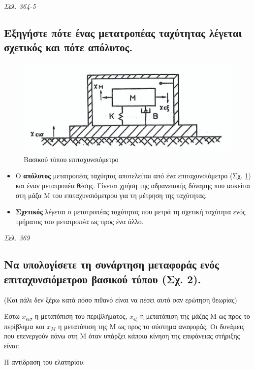 \documentclass{article}
\begin{document}
\emph{Σελ. 364-5}

\subsection{Εξηγήστε πότε ένας μετατροπέας ταχύτητας λέγεται σχετικός και πότε απόλυτος.}

\begin{figure}[h!]
    \includegraphics[width=\linewidth]{epitaxinsiometro.png}
    \caption{Βασικού τύπου επιταχυνσιόμετρο}
    \label{fig:5.1epitax}
\end{figure}

\begin{itemize}
    \item Ο \textbf{απόλυτος} μετατροπέας ταχύητας αποτελείται από ένα επιταχυνσιόμετρο (Σχ. \ref{fig:5.1epitax}) και έναν μετατροπέα θέσης.
        Γίνεται χρήση της  αδρανειακής δύναμης που ασκείται στη μάζα Μ του επιταχυνσιόμετρου για τη μέτρηση της ταχύτητας.
    \item \textbf{Σχετικός} λέγεται ο μετατροπέας ταχύτητας που μετρά τη σχετική ταχύτητα ενός τμήματος του μετατροπέα ως προς ένα άλλο.
\end{itemize}

\emph{Σελ. 369}

\subsection{Να υπολογίσετε τη συνάρτηση μεταφοράς ενός επιταχυνσιόμετρου βασικού τύπου (Σχ. 2).}
(Και πάλι δεν ξέρω κατά πόσο πιθανό είναι να πέσει αυτό σαν ερώτηση θεωρίας)

Έστω $x_{\epsilon\iota\sigma}$ η μετατόπιση του περιβλήματος, $x_{\epsilon\xi}$ η μετατόπιση της μάζας Μ ως προς το περίβλημα και $x_M$
η μετατόπιση της Μ ως προς το σύστημα αναφοράς. Οι δυνάμεις που επενεργούν πάνω στη Μ όταν υπάρξει κάποια κίνηση της επιφάνειας στήριξης 
είναι:

Η αντίδραση του ελατηρίου:
\end{document}

